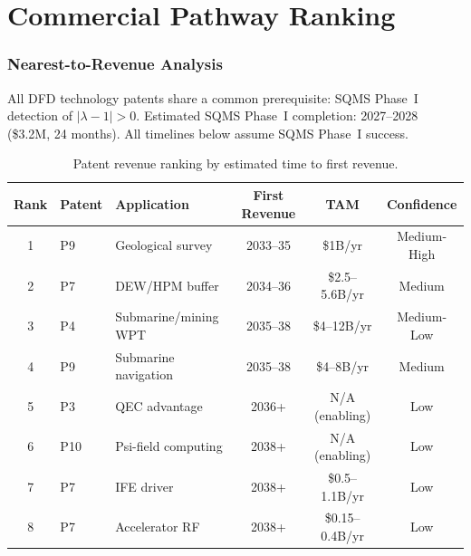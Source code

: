 \documentclass[11pt]{article}
\newcommand{\lambdaone}{|\lambda{-}1|}
\begin{document}
\part{Commercial Pathway Ranking}
\label{part:commercial}

\section{Nearest-to-Revenue Analysis}
\label{sec:revenue-ranking}

All DFD technology patents share a common prerequisite: SQMS Phase~I
detection of $\lambdaone > 0$. Estimated SQMS Phase~I completion:
2027--2028 (\$3.2M, 24 months). All timelines below assume SQMS
Phase~I success.

\begin{table}[H]
\centering
\caption{Patent revenue ranking by estimated time to first revenue.}
\label{tab:revenue-ranking}
\begin{tabular}{@{}clp{4cm}ccc@{}}
\toprule
Rank & Patent & Application & First Revenue & TAM & Confidence \\
\midrule
1 & P9 & Geological survey & 2033--35 & \$1B/yr & Medium-High \\
2 & P7 & DEW/HPM buffer & 2034--36 & \$2.5--5.6B/yr & Medium \\
3 & P4 & Submarine/mining WPT & 2035--38 & \$4--12B/yr & Medium-Low \\
4 & P9 & Submarine navigation & 2035--38 & \$4--8B/yr & Medium \\
5 & P3 & QEC advantage & 2036+ & N/A (enabling) & Low \\
6 & P10 & Psi-field computing & 2038+ & N/A (enabling) & Low \\
7 & P7 & IFE driver & 2038+ & \$0.5--1.1B/yr & Low \\
8 & P7 & Accelerator RF & 2038+ & \$0.15--0.4B/yr & Low \\
\bottomrule
\end{tabular}
\end{table}
\end{document}
